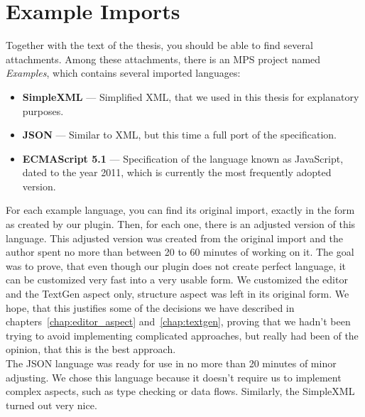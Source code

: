 \chapter{Example Imports}
\label{chap:examples}

Together with the text of the thesis, you should be able to find several attachments.
Among these attachments, there is an MPS project named \textit{Examples}, which contains several imported languages:

\begin{itemize}
	\item \textbf{SimpleXML} --- Simplified XML, that we used in this thesis for explanatory purposes.
	
	\item \textbf{JSON} --- Similar to XML, but this time a full port of the specification.
	
	\item \textbf{ECMAScript 5.1} --- Specification of the language known as JavaScript, dated to the year 2011, which is currently the most frequently adopted version.
\end{itemize}

For each example language, you can find its original import, exactly in the form as created by our plugin.
Then, for each one, there is an adjusted version of this language.
This adjusted version was created from the original import and the author spent no more than between 20 to 60 minutes of working on it.
The goal was to prove, that even though our plugin does not create perfect language, it can be customized very fast into a very usable form.
We customized the editor and the TextGen aspect only, structure aspect was left in its original form.
We hope, that this justifies some of the decisions we have described in chapters~\ref{chap:editor_aspect} and~\ref{chap:textgen}, proving that we hadn't been trying to avoid implementing complicated approaches, but really had been of the opinion, that this is the best approach.
\\

The JSON language was ready for use in no more than 20 minutes of minor adjusting.
We chose this language because it doesn't require us to implement complex aspects, such as type checking or data flows.
Similarly, the SimpleXML turned out very nice.
\\

